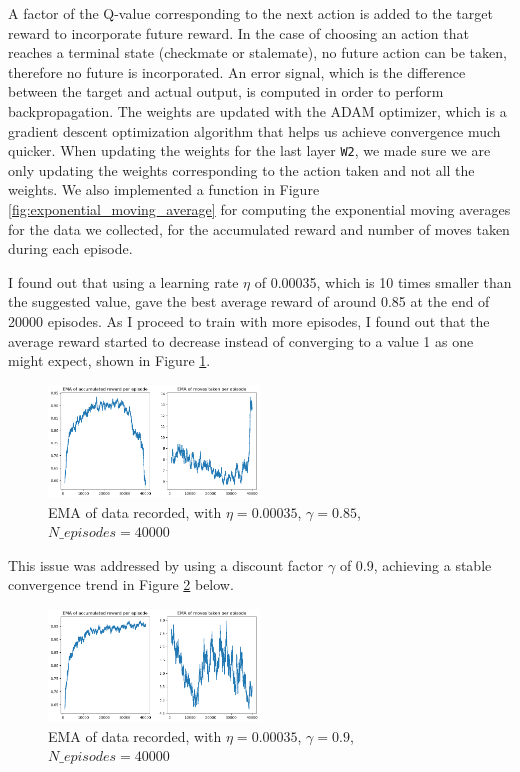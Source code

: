\documentclass[conference]{IEEEtran}
\begin{document}
A factor of the Q-value corresponding to the next action is added to the target reward to incorporate future reward. In the case of choosing an action that reaches a terminal state (checkmate or stalemate), no future action can be taken, therefore no future is incorporated. An error signal, which is the difference between the target and actual output, is computed in order to perform backpropagation. The weights are updated with the ADAM optimizer, which is a gradient descent optimization algorithm that helps us achieve convergence much quicker. When updating the weights for the last layer \texttt{W2}, we made sure we are only updating the weights corresponding to the action taken and not all the weights. We also implemented a function in Figure \ref{fig:exponential_moving_average} for computing the exponential moving averages for the data we collected, for the accumulated reward and number of moves taken during each episode.

I found out that using a learning rate $\eta$ of 0.00035, which is 10 times smaller than the suggested value, gave the best average reward of around 0.85 at the end of 20000 episodes. As I proceed to train with more episodes, I found out that the average reward started to decrease instead of converging to a value 1 as one might expect, shown in Figure \ref{fig:gamma_0_85}.

\begin{figure}[htbp]
\centerline{\includegraphics[width=0.5\textwidth]{images/gamma_0_85.png}}
\caption{EMA of data recorded, with $\eta=0.00035$, $\gamma=0.85$, $N\_episodes=40000$}
\label{fig:gamma_0_85}
\end{figure}

This issue was addressed by using a discount factor $\gamma$ of 0.9, achieving a stable convergence trend in Figure \ref{fig:gamma_0_90} below.

\begin{figure}[htbp]
\centerline{\includegraphics[width=0.5\textwidth]{images/gamma_0_90.png}}
\caption{EMA of data recorded, with $\eta=0.00035$, $\gamma=0.9$, $N\_episodes=40000$}
\label{fig:gamma_0_90}
\end{figure}
\end{document}
